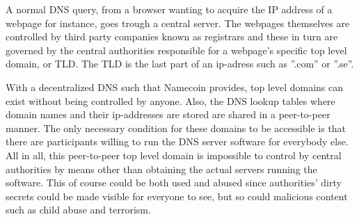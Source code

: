 A normal DNS query, from a browser wanting to acquire the IP address of a webpage for instance, goes trough a central server\cite{CryptoCoinInsider:2014:Online}. The webpages themselves are controlled by third party companies known as registrars and these in turn are governed by the central authorities responsible for a webpage’s specific top level domain, or TLD. The TLD is the last part of an ip-adress such as ”.com” or ”.se”.

With a decentralized DNS such that Namecoin provides, top level domains can exist without being controlled by anyone\cite{CryptoCoinInsider:2014:Online}. Also, the DNS lookup tables where domain names and their ip-addresses are stored are shared in a peer-to-peer manner. The only necessary condition for these domains to be accessible is that there are participants willing to run the DNS server software for everybody else. All in all, this peer-to-peer top level domain is impossible to control by central authorities by means other than obtaining the actual servers running the software. This of course could be both used and abused since authorities’ dirty secrets could be made visible for everyone to see, but so could malicious content such as child abuse and terrorism.
